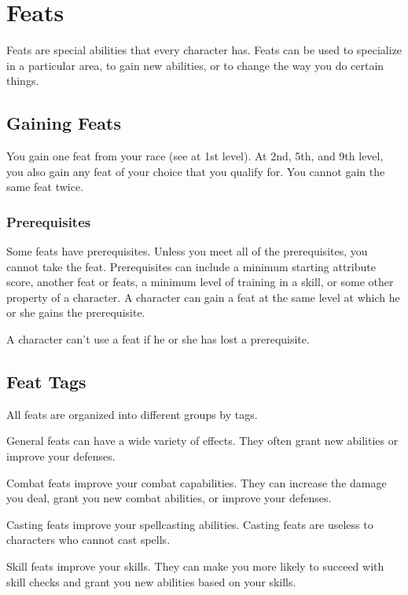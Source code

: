 \chapter{Feats}\label{Feats}

Feats are special abilities that every character has.
Feats can be used to specialize in a particular area, to gain new abilities, or to change the way you do certain things.

\section{Gaining Feats}
    You gain one feat from your race (see  at 1st level).
    At 2nd, 5th, and 9th level, you also gain any feat of your choice that you qualify for.
    You cannot gain the same feat twice.

    \subsection{Prerequisites}
        Some feats have prerequisites.
        Unless you meet all of the prerequisites, you cannot take the feat.
        Prerequisites can include a minimum starting attribute score, another feat or feats, a minimum level of training in a skill, or some other property of a character.
        A character can gain a feat at the same level at which he or she gains the prerequisite.

        A character can't use a feat if he or she has lost a prerequisite.

\section{Feat Tags}
    All feats are organized into different groups by tags.

     General feats can have a wide variety of effects.
    They often grant new abilities or improve your defenses.

     Combat feats improve your combat capabilities.
    They can increase the damage you deal, grant you new combat abilities, or improve your defenses.

     Casting feats improve your spellcasting abilities.
    Casting feats are useless to characters who cannot cast spells.

     Skill feats improve your skills.
    They can make you more likely to succeed with skill checks and grant you new abilities based on your skills.


